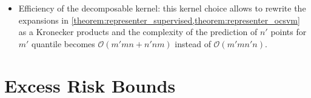 \begin{itemize}[labelindent=0em,leftmargin=*,topsep=0cm,partopsep=0cm,
                parsep=2mm,itemsep=0cm]
    \item Efficiency of the decomposable kernel: this kernel choice
    allows to rewrite the expansions in
    \cref{theorem:representer_supervised,theorem:representer_ocsvm} as a
    Kronecker products and the complexity of the prediction of $n'$ points
    for $m'$ quantile becomes $\mathcal{O}(m'mn + n'nm)$ instead of
    $\mathcal{O}(m'mn'n)$.
\end{itemize}

\section{Excess Risk Bounds}\label{sec:excess-risk}
